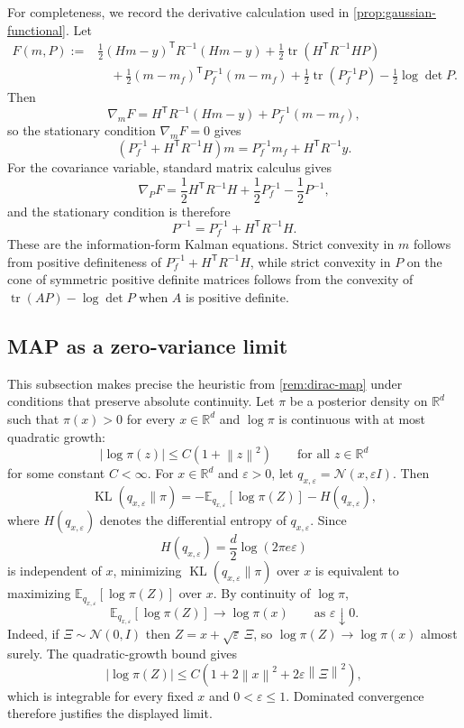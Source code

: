 \documentclass[11pt]{article}
\newcommand{\R}{\mathbb{R}}
\newcommand{\E}{\mathbb{E}}
\newcommand{\KL}{\operatorname{KL}}
\newcommand{\tr}{\operatorname{tr}}
\newcommand{\Id}{I}
\newcommand{\norm}[1]{\left\lVert #1 \right\rVert}
\newcommand{\abs}[1]{\left\lvert #1 \right\rvert}
\newcommand{\parens}[1]{\left( #1 \right)}
\newcommand{\transpose}{^{\mathsf T}}
\numberwithin{equation}{section}
\theoremstyle{plain}
\theoremstyle{definition}
\theoremstyle{remark}
\begin{document}
For completeness, we record the derivative calculation used in \cref{prop:gaussian-functional}. Let
\begin{align*}
F(m,P)
:={}&
\frac12 (Hm-y)\transpose R^{-1}(Hm-y)
+\frac12\tr(H\transpose R^{-1}HP)
\nonumber\\
&\quad
+\frac12(m-m_f)\transpose P_f^{-1}(m-m_f)
+\frac12\tr(P_f^{-1}P)
-\frac12\log\det P.
\end{align*}
Then
\[
\nabla_m F
=
H\transpose R^{-1}(Hm-y)+P_f^{-1}(m-m_f),
\]
so the stationary condition $\nabla_mF=0$ gives
\[
\parens{P_f^{-1}+H\transpose R^{-1}H}m = P_f^{-1}m_f + H\transpose R^{-1}y.
\]
For the covariance variable, standard matrix calculus gives
\[
\nabla_P F
=
\frac12 H\transpose R^{-1}H + \frac12 P_f^{-1} - \frac12 P^{-1},
\]
and the stationary condition is therefore
\[
P^{-1}=P_f^{-1}+H\transpose R^{-1}H.
\]
These are the information-form Kalman equations. Strict convexity in $m$ follows from positive definiteness of $P_f^{-1}+H\transpose R^{-1}H$, while strict convexity in $P$ on the cone of symmetric positive definite matrices follows from the convexity of $\tr(AP)-\log\det P$ when $A$ is positive definite.

\subsection{MAP as a zero-variance limit}
\label{app:map-limit}

This subsection makes precise the heuristic from \cref{rem:dirac-map} under conditions that preserve absolute continuity. Let $\pi$ be a posterior density on $\R^d$ such that $\pi(x)>0$ for every $x\in\R^d$ and $\log \pi$ is continuous with at most quadratic growth:
\[
\abs{\log \pi(z)}\le C(1+\norm{z}^2)
\qquad\text{for all }z\in\R^d
\]
for some constant $C<\infty$. For $x\in\R^d$ and $\varepsilon>0$, let $q_{x,\varepsilon}=\mathcal N(x,\varepsilon \Id)$. Then
\[
\KL(q_{x,\varepsilon}\|\pi)
=
-\E_{q_{x,\varepsilon}}[\log \pi(Z)] - H(q_{x,\varepsilon}),
\]
where $H(q_{x,\varepsilon})$ denotes the differential entropy of $q_{x,\varepsilon}$. Since
\[
H(q_{x,\varepsilon}) = \frac d2\log(2\pi e\varepsilon)
\]
is independent of $x$, minimizing $\KL(q_{x,\varepsilon}\|\pi)$ over $x$ is equivalent to maximizing $\E_{q_{x,\varepsilon}}[\log \pi(Z)]$ over $x$. By continuity of $\log \pi$,
\[
\E_{q_{x,\varepsilon}}[\log \pi(Z)] \to \log \pi(x)
\qquad\text{as }\varepsilon\downarrow 0.
\]
Indeed, if $\Xi\sim\mathcal N(0,\Id)$ then $Z=x+\sqrt{\varepsilon}\,\Xi$, so $\log \pi(Z)\to\log \pi(x)$ almost surely. The quadratic-growth bound gives
\[
\abs{\log \pi(Z)}
\le
C\parens{1+2\norm{x}^2+2\varepsilon\norm{\Xi}^2},
\]
which is integrable for every fixed $x$ and $0<\varepsilon\le 1$. Dominated convergence therefore justifies the displayed limit.
\end{document}
